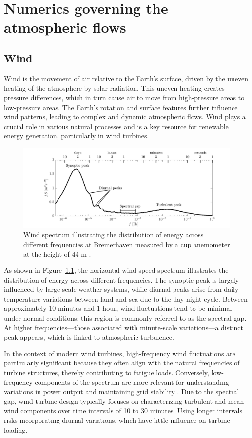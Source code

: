 \chapter{Numerics governing the atmospheric flows} \label{cha:NUM}
\section{Wind}
Wind is the movement of air relative to the Earth's surface, driven by the uneven heating of the atmosphere by solar radiation. This uneven heating creates pressure differences, which in turn cause air to move from high-pressure areas to low-pressure areas. The Earth's rotation and surface features further influence wind patterns, leading to complex and dynamic atmospheric flows. Wind plays a crucial role in various natural processes and is a key resource for renewable energy generation, particularly in wind turbines. 

\begin{figure}[ht]
    \centering
    \includegraphics[width=\textwidth]{Figures/WindSpectra.png}
    \caption{Wind spectrum illustrating the distribution of energy across different frequencies at Bremerhaven measured by a cup anemometer
    at the height of 44 m \cite{Rettenmeier2013}.}
    \label{fig:windspectrum}
\end{figure}
As shown in Figure~\ref{fig:windspectrum}, the horizontal wind speed spectrum illustrates the distribution of energy across different frequencies. The synoptic peak is largely influenced by large-scale weather systems, while diurnal peaks arise from daily temperature variations between land and sea due to the day-night cycle. Between approximately 10 minutes and 1 hour, wind fluctuations tend to be minimal under normal conditions; this region is commonly referred to as the spectral gap. At higher frequencies—those associated with minute-scale variations—a distinct peak appears, which is linked to atmospheric turbulence.

In the context of modern wind turbines, high-frequency wind fluctuations are particularly significant because they often align with the natural frequencies of turbine structures, thereby contributing to fatigue loads. Conversely, low-frequency components of the spectrum are more relevant for understanding variations in power output and maintaining grid stability \cite{kosovic2025}. Due to the spectral gap, wind turbine design typically focuses on characterizing turbulent and mean wind components over time intervals of 10 to 30 minutes. Using longer intervals risks incorporating diurnal variations, which have little influence on turbine loading.

